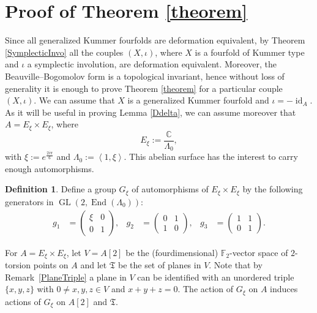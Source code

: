 \documentclass{alggeom}
\DeclareMathOperator{\End}{End}
\DeclareMathOperator{\id}{id}
\DeclareMathOperator{\GL}{GL}
\newcommand{\C}{\mathbb{C}}
\theoremstyle{plain}
\theoremstyle{definition}
\newtheorem{definition}[theorem]{Definition}
\theoremstyle{remark}
\begin{document}
\section{Proof of Theorem \ref{theorem}}\label{BeauvilleForm}
Since all generalized Kummer fourfolds are deformation equivalent, by Theorem \ref{SymplecticInvo} all the couples $(X,\iota)$, where $X$ is a fourfold of Kummer type and $\iota$ a symplectic involution, are deformation equivalent.
Moreover, the Beauville--Bogomolov form is a topological invariant, 
hence without loss of generality it is enough to prove Theorem \ref{theorem} for a particular couple $(X,\iota)$.
We can assume that $X$ is a generalized Kummer fourfold and $\iota=-\id_A$. As it will be useful in proving Lemma \ref{Ddelta}, we can assume moreover that $A=E_\xi\times E_\xi$, where 
$$E_\xi:=\frac{\C}{\Lambda_0},$$
with $\xi:=e^{\frac{2i\pi}{6}}$ and $\Lambda_0 := \left<1,\xi\right>$.
This abelian surface has the interest to carry enough automorphisms.
\begin{definition}\label{elliptic6}
Define a group $G_\xi$ of automorphisms of $E_\xi\times E_\xi$ by the following generators in $\GL(2,\End(\Lambda_0))$:
\begin{align*}
g_1 &= \left( {\begin{array}{cc}
   \xi & 0 \\       0 & 1      
   \end{array} } \right),
 &
g_2 &= \left( {\begin{array}{cc}
   0 & 1 \\       1 & 0      
   \end{array} } \right),
 &
g_3 &= \left( {\begin{array}{cc}
   1 & 1 \\       0 & 1     
   \end{array} } \right).
\end{align*}
\end{definition}
For $A=E_\xi\times E_\xi$, let $V =A[2]$ be the (fourdimensional) $\mathbb F_2$-vector space of $2$-torsion points on $A$ and let $\mathfrak T$ be the set of planes in $V$. Note that by Remark~\ref{PlaneTriple} a plane in $V$ can be identified with an unordered triple $\{x,y,z\}$ with $0\neq x,y,z\in V$ and $x+y+z=0$. The action of $G_\xi$ on $A$ induces actions of $G_\xi$ on $A[2]$ and $\mathfrak T$. 
\end{document}
